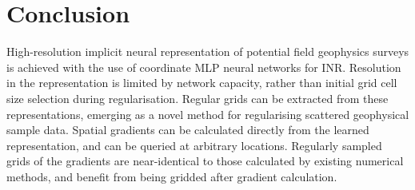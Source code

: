 \section{Conclusion}
High-resolution implicit neural representation of potential field geophysics surveys is achieved with the use of coordinate MLP neural networks for INR\@.
Resolution in the representation is limited by network capacity, rather than initial grid cell size selection during regularisation.
Regular grids can be extracted from these representations, emerging as a novel method for regularising scattered geophysical sample data.
Spatial gradients can be calculated directly from the learned representation, and can be queried at arbitrary locations.
Regularly sampled grids of the gradients are near-identical to those calculated by existing numerical methods, and benefit from being gridded after gradient calculation.







% 